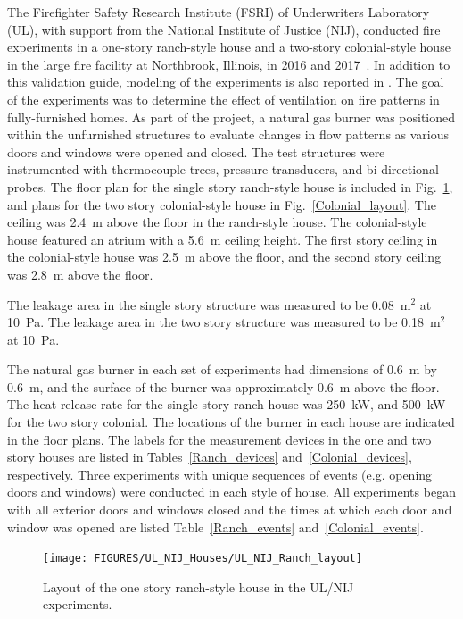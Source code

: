 The Firefighter Safety Research Institute (FSRI) of Underwriters Laboratory (UL), with support from the National Institute of Justice (NIJ), conducted fire experiments in a one-story ranch-style house and a two-story colonial-style house in the large fire facility at Northbrook, Illinois, in 2016 and 2017~\cite{Madrzykowski:2019}. In addition to this validation guide, modeling of the experiments is also reported in \cite{McKinnon:FISJ2021}.  The goal of the experiments was to determine the effect of ventilation on fire patterns in fully-furnished homes. As part of the project, a natural gas burner was positioned within the unfurnished structures to evaluate changes in flow patterns as various doors and windows were opened and closed. The test structures were instrumented with thermocouple trees, pressure transducers, and bi-directional probes. The floor plan for the single story ranch-style house is included in Fig.~\ref{Ranch_layout}, and plans for the two story colonial-style house in Fig.~\ref{Colonial_layout}. The ceiling was 2.4~m above the floor in the ranch-style house. The colonial-style house featured an atrium with a 5.6~m ceiling height. The first story ceiling in the colonial-style house was 2.5~m above the floor, and the second story ceiling was 2.8~m above the floor.

The leakage area in the single story structure was measured to be 0.08~m$^2$ at 10~Pa. The leakage area in the two story structure was measured to be 0.18~m$^2$ at 10~Pa.

The natural gas burner in each set of experiments had dimensions of 0.6~m by 0.6~m, and the surface of the burner was approximately 0.6~m above the floor. The heat release rate for the single story ranch house was 250~kW, and 500~kW for the two story colonial. The locations of the burner in each house are indicated in the floor plans. The labels for the measurement devices in the one and two story houses are listed in Tables~\ref{Ranch_devices} and~\ref{Colonial_devices}, respectively. Three experiments with unique sequences of events (e.g. opening doors and windows) were conducted in each style of house. All experiments began with all exterior doors and windows closed and the times at which each door and window was opened are listed Table~\ref{Ranch_events} and~\ref{Colonial_events}.

\begin{figure}[p]
\texttt{[image: FIGURES/UL\_NIJ\_Houses/UL\_NIJ\_Ranch\_layout]}
\caption[Layout of the one story ranch-style house in the UL/NIJ experiments]{Layout of the one story ranch-style house in the UL/NIJ experiments.}
\label{Ranch_layout}
\end{figure}

